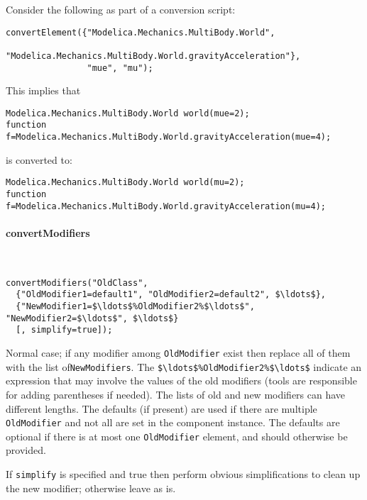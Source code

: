 \begin{example}
Consider the following as part of a conversion script:
\begin{lstlisting}[language=modelica]
convertElement({"Modelica.Mechanics.MultiBody.World",
                "Modelica.Mechanics.MultiBody.World.gravityAcceleration"},
                "mue", "mu");
\end{lstlisting}
This implies that
\begin{lstlisting}[language=modelica]
Modelica.Mechanics.MultiBody.World world(mue=2);
function f=Modelica.Mechanics.MultiBody.World.gravityAcceleration(mue=4);
\end{lstlisting}
is converted to:
\begin{lstlisting}[language=modelica]
Modelica.Mechanics.MultiBody.World world(mu=2);
function f=Modelica.Mechanics.MultiBody.World.gravityAcceleration(mu=4);
\end{lstlisting}
\end{example}

\paragraph*{convertModifiers}\label{convertmodifiers}
\ %

\begin{lstlisting}[language=modelica]
convertModifiers("OldClass",
  {"OldModifier1=default1", "OldModifier2=default2", $\ldots$},
  {"NewModifier1=$\ldots$%OldModifier2%$\ldots$", "NewModifier2=$\ldots$", $\ldots$}
  [, simplify=true]);
\end{lstlisting}

Normal case; if any modifier among \lstinline!OldModifier! exist then replace all of them with the list of\linebreak[4] \lstinline!NewModifiers!.
The \lstinline!$\ldots$%OldModifier2%$\ldots$! indicate an expression that may involve the values of the old modifiers (tools are responsible for adding parentheses if needed).
The lists of old and new modifiers can have different lengths.
The defaults (if present) are used if there are multiple \lstinline!OldModifier! and not all are set in the component instance.
The defaults are optional if there is at most one \lstinline!OldModifier! element, and should otherwise be provided.

If \lstinline!simplify! is specified and true then perform obvious simplifications to clean up the new modifier; otherwise leave as is.

